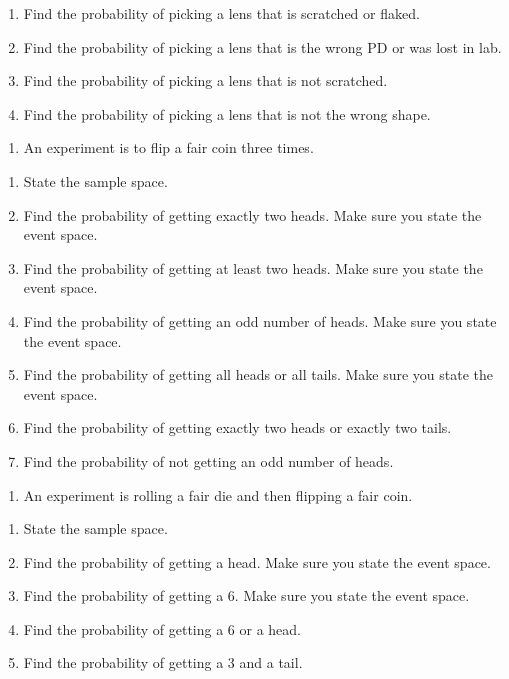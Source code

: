 \documentclass[]{book}
\providecommand{\tightlist}{%
  \setlength{\itemsep}{0pt}\setlength{\parskip}{0pt}}
\begin{document}
\begin{enumerate}
\def\labelenumi{\alph{enumi}.}
\tightlist
\item
  Find the probability of picking a lens that is scratched or flaked.
\item
  Find the probability of picking a lens that is the wrong PD or was lost in lab.
\item
  Find the probability of picking a lens that is not scratched.
\item
  Find the probability of picking a lens that is not the wrong shape.
\end{enumerate}

\begin{enumerate}
\def\labelenumi{\arabic{enumi}.}
\setcounter{enumi}{2}
\tightlist
\item
  An experiment is to flip a fair coin three times.
\end{enumerate}

\begin{enumerate}
\def\labelenumi{\alph{enumi}.}
\tightlist
\item
  State the sample space.
\item
  Find the probability of getting exactly two heads. Make sure you
  state the event space.
\item
  Find the probability of getting at least two heads. Make sure you
  state the event space.
\item
  Find the probability of getting an odd number of heads. Make sure
  you state the event space.
\item
  Find the probability of getting all heads or all tails. Make sure
  you state the event space.
\item
  Find the probability of getting exactly two heads or exactly two
  tails.
\item
  Find the probability of not getting an odd number of heads.
\end{enumerate}

\begin{enumerate}
\def\labelenumi{\arabic{enumi}.}
\setcounter{enumi}{3}
\tightlist
\item
  An experiment is rolling a fair die and then flipping a fair coin.
\end{enumerate}

\begin{enumerate}
\def\labelenumi{\alph{enumi}.}
\tightlist
\item
  State the sample space.
\item
  Find the probability of getting a head. Make sure you state the
  event space.
\item
  Find the probability of getting a 6. Make sure you state the event
  space.
\item
  Find the probability of getting a 6 or a head.
\item
  Find the probability of getting a 3 and a tail.
\end{enumerate}
\end{document}
